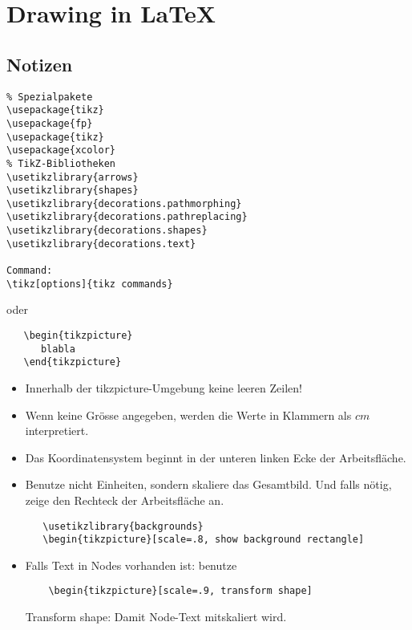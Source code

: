 \documentclass[12pt, a4paper]{scrartcl}
\begin{document}
\section*{Drawing in \LaTeX}
\tableofcontents
\pagebreak

\subsection{Notizen}

\begin{verbatim}
% Spezialpakete
\usepackage{tikz}
\usepackage{fp}
\usepackage{tikz}
\usepackage{xcolor}
% TikZ-Bibliotheken
\usetikzlibrary{arrows}
\usetikzlibrary{shapes}
\usetikzlibrary{decorations.pathmorphing}
\usetikzlibrary{decorations.pathreplacing}
\usetikzlibrary{decorations.shapes}
\usetikzlibrary{decorations.text}

Command:
\tikz[options]{tikz commands}
\end{verbatim}

oder

\begin{verbatim}
   \begin{tikzpicture}
      blabla
   \end{tikzpicture}

\end{verbatim}


\begin{itemize}
   \item Innerhalb der tikzpicture-Umgebung keine leeren Zeilen!

   \item Wenn keine Grösse angegeben, werden die Werte in Klammern als $cm$ interpretiert.

   \item Das Koordinatensystem beginnt in der unteren linken Ecke der Arbeitsfläche.

   \item Benutze nicht Einheiten, sondern skaliere das Gesamtbild. Und falls nötig, zeige den Rechteck der Arbeitsfläche an.
   \begin{verbatim}
   \usetikzlibrary{backgrounds}
   \begin{tikzpicture}[scale=.8, show background rectangle]
   \end{verbatim}

   \item Falls Text in Nodes vorhanden ist: benutze
   \begin{verbatim}
    \begin{tikzpicture}[scale=.9, transform shape]
    \end{verbatim} Transform shape: Damit Node-Text mitskaliert wird.

\end{itemize}
\end{document}

